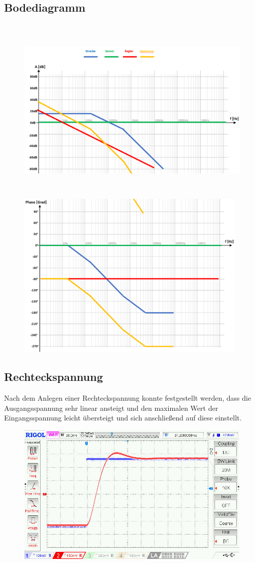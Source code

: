 \documentclass[twoside]{article}
\begin{document}
\subsection{Bodediagramm}
\begin{figure}[h]
    \centering
    \includegraphics[width=1\linewidth, height=9cm]{img/Bode_07.png}
    \includegraphics[width=1\linewidth, height=8cm]{img/Bode_08.png}
\end{figure}

\subsection{Rechteckspannung}
Nach dem Anlegen einer Rechteckspannung konnte festgestellt werden, dass die Ausgangsspannung sehr linear ansteigt und den maximalen Wert der Eingangsspannung leicht übersteigt und sich anschließend auf diese einstellt.
\begin{figure}[h]
    \centering
    \includegraphics[width=0.8\linewidth]{img/Oszi_02.jpg}
\end{figure}
\end{document}
